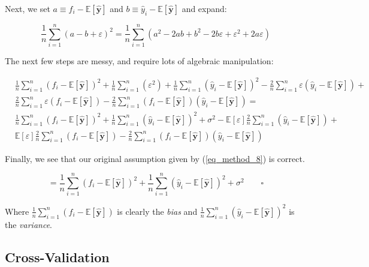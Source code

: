 \documentclass[a4paper,10pt,english]{article}
\begin{document}
	Next, we set $a \equiv f_i - \mathbb{E}[\hat{\mathbf{y}}] $ and $b \equiv \hat{y}_i - \mathbb{E}[\hat{\mathbf{y}}]$ and expand:
	
	\begin{equation*}
	\frac{1}{n} \sum_{i=1}^{n} (a - b + \varepsilon )^2
	= \frac{1}{n} \sum_{i=1}^{n} ( a^2 - 2ab + b^2 - 2b\varepsilon + \varepsilon^2 + 2a\varepsilon )
	\end{equation*}
	
	The next few steps are messy, and require lots of algebraic manipulation:	
	
	\begin{align*}	
	& \frac{1}{n} \sum_{i=1}^{n} ( f_i - \mathbb{E}[\hat{\mathbf{y}}] )^2 
	+ \frac{1}{n} \sum_{i=1}^{n} ( \varepsilon^2 )
	+ \frac{1}{n} \sum_{i=1}^{n} ( \hat{y}_i - \mathbb{E}[\hat{\mathbf{y}}] )^2 
	- \frac{2}{n} \sum_{i=1}^{n} \varepsilon ( \hat{y}_i - \mathbb{E}[\hat{\mathbf{y}}] )
	+ \\ &\frac{2}{n} \sum_{i=1}^{n} \varepsilon ( f_i - \mathbb{E}[\hat{\mathbf{y}}] )
	- \frac{2}{n} \sum_{i=1}^{n} ( f_i - \mathbb{E}[\hat{\mathbf{y}}] ) ( \hat{y}_i - \mathbb{E}[\hat{\mathbf{y}}] )
	= \\ & \frac{1}{n} \sum_{i=1}^{n} ( f_i - \mathbb{E}[\hat{\mathbf{y}}] )^2 
	+ \frac{1}{n} \sum_{i=1}^{n} ( \hat{y}_i - \mathbb{E}[\hat{\mathbf{y}}] )^2 
	+ \sigma^2
	- \mathbb{E}[\varepsilon] \frac{2}{n} \sum_{i=1}^{n} ( \hat{y}_i - \mathbb{E}[\hat{\mathbf{y}}] )
	+ \\ & \mathbb{E}[\varepsilon] \frac{2}{n} \sum_{i=1}^{n} ( f_i - \mathbb{E}[\hat{\mathbf{y}}] )
	-\frac{2}{n} \sum_{i=1}^{n} ( f_i - \mathbb{E}[\hat{\mathbf{y}}] ) ( \hat{y}_i - \mathbb{E}[\hat{\mathbf{y}}] )
	\end{align*}
	
	Finally, we see that our original assumption given by (\ref{eq_method_8}) is correct.
	
	\begin{equation*}
	= \frac{1}{n} \sum_{i=1}^{n} ( f_i - \mathbb{E}[\hat{\mathbf{y}}] )^2 
	+ \frac{1}{n} \sum_{i=1}^{n} ( \hat{y}_i - \mathbb{E}[\hat{\mathbf{y}}] )^2 
	+ \sigma^2 \qquad \square
	\end{equation*}
	
	Where $\frac{1}{n} \sum_{i=1}^{n} ( f_i - \mathbb{E}[\hat{\mathbf{y}}] )$ is clearly the \textit{bias} and
	$\frac{1}{n} \sum_{i=1}^{n} ( \hat{y}_i - \mathbb{E}[\hat{\mathbf{y}}] )^2$ is the \textit{variance}.	
	
	\subsection*{Cross-Validation}
	
\end{document}

